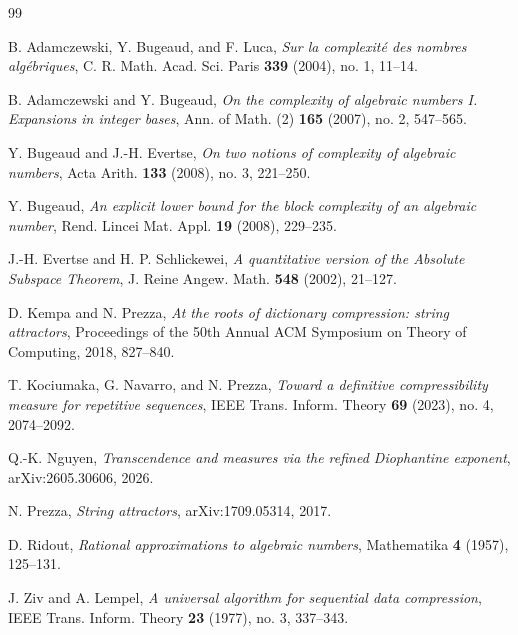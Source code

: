 \documentclass[11pt]{amsart}
\theoremstyle{definition}
\begin{document}
\begin{thebibliography}{99}

B. Adamczewski, Y. Bugeaud, and F. Luca,
\emph{Sur la complexit\'{e} des nombres alg\'{e}briques},
C. R. Math. Acad. Sci. Paris \textbf{339} (2004), no. 1, 11--14.

B. Adamczewski and Y. Bugeaud,
\emph{On the complexity of algebraic numbers I. Expansions in integer bases},
Ann. of Math. (2) \textbf{165} (2007), no. 2, 547--565.

Y. Bugeaud and J.-H. Evertse,
\emph{On two notions of complexity of algebraic numbers},
Acta Arith. \textbf{133} (2008), no. 3, 221--250.

Y. Bugeaud,
\emph{An explicit lower bound for the block complexity of an algebraic number},
Rend. Lincei Mat. Appl. \textbf{19} (2008), 229--235.

J.-H. Evertse and H. P. Schlickewei,
\emph{A quantitative version of the Absolute Subspace Theorem},
J. Reine Angew. Math. \textbf{548} (2002), 21--127.

D. Kempa and N. Prezza,
\emph{At the roots of dictionary compression: string attractors},
Proceedings of the 50th Annual ACM Symposium on Theory of Computing, 2018, 827--840.

T. Kociumaka, G. Navarro, and N. Prezza,
\emph{Toward a definitive compressibility measure for repetitive sequences},
IEEE Trans. Inform. Theory \textbf{69} (2023), no. 4, 2074--2092.

Q.-K. Nguyen,
\emph{Transcendence and measures via the refined Diophantine exponent},
arXiv:2605.30606, 2026.

N. Prezza,
\emph{String attractors},
arXiv:1709.05314, 2017.

D. Ridout,
\emph{Rational approximations to algebraic numbers},
Mathematika \textbf{4} (1957), 125--131.

J. Ziv and A. Lempel,
\emph{A universal algorithm for sequential data compression},
IEEE Trans. Inform. Theory \textbf{23} (1977), no. 3, 337--343.

\end{thebibliography}
\end{document}
